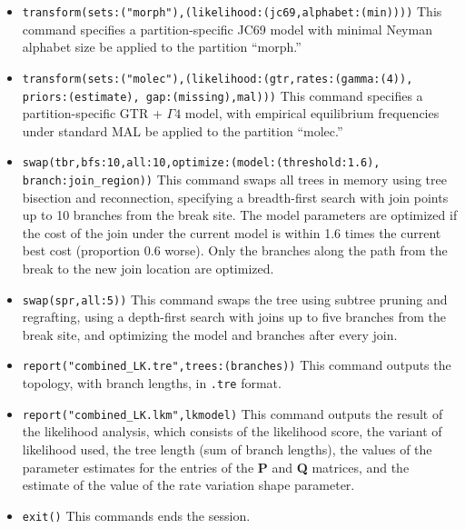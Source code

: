 \begin{itemize}
\item \texttt{transform(sets:("morph"),(likelihood:(jc69,alphabet:(min))))} %
This command specifies a partition-specific JC69 model with minimal Neyman alphabet size be applied to the 
partition ``morph.''
\item \texttt{transform(sets:("molec"),(likelihood:(gtr,rates:(gamma:(4)),\\priors:(estimate), gap:(missing),mal)))} 
This command specifies a partition-specific GTR + $\Gamma 4$ model, with empirical equilibrium frequencies 
under standard MAL be applied to the partition ``molec.'' 
\item \texttt{swap(tbr,bfs:10,all:10,optimize:(model:(threshold:1.6),\\branch:join\_region))}
This command swaps all trees in memory using tree bisection and reconnection, specifying a breadth-first search with join
points up to 10 branches from the break site. The model parameters are optimized if the cost of the join under the 
current model is within 1.6 times the current best cost (proportion 0.6 worse). Only the branches along the path from the 
break to the new join location are optimized.  
\item \texttt{swap(spr,all:5))} This command swaps the tree using subtree pruning and regrafting, using a depth-first
search with joins up to five branches from the break site, and optimizing the model and branches after every join. 
\item \texttt{report("combined\_LK.tre",trees:(branches))} This command outputs the topology, with branch lengths, in 
\texttt{.tre} format.
\item \texttt{report("combined\_LK.lkm",lkmodel)} This command outputs the result of the likelihood analysis, which 
consists of the likelihood score, the variant of likelihood used, the tree length (sum of branch lengths), the values 
of the parameter estimates for the entries of the \textbf{P} and \textbf{Q} matrices, and the estimate of the value of 
the rate variation shape parameter.
\item \texttt{exit()} This commands ends the \poy session.
\end{itemize}

